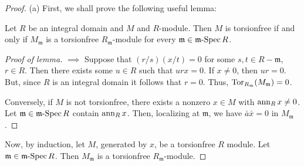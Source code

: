 \begin{proof}
(a) First, we shall prove the following useful lemma:
\begin{lemma*}
Let $R$ be an integral domain and $M$ and $R$-module. Then $M$ is
torsionfree if and only if $M_{\mathfrak{m}}$ is a torsionfree
$R_{\mathfrak{m}}$-module for every $\mathfrak{m}\in\operatorname{\mathfrak{m}-Spec} R$.
\end{lemma*}
\begin{proof}[Proof of lemma]
\renewcommand{\qedsymbol}{$\clubsuit$}
$\implies$ Suppose that $(r/s)(x/t)=0$ for some $s,t\in
R\minus\mathfrak{m}$, $r\in R$. Then there exists some $u\in R$ such that
$urx=0$. If $x\neq 0$, then $ur=0$. But, since $R$ is an integral domain it
follows that $r=0$. Thus, $\operatorname{Tor}_{R_\mathfrak{m}}(M_{\mathfrak{m}})=0$.

Conversely, if $M$ is not torsionfree, there exists a nonzero $x\in M$ with
$\operatorname{ann}_R x\neq 0$. Let $\mathfrak{m}\in\operatorname{\mathfrak{m}-Spec} R$ contain $\operatorname{ann}_R x$. Then,
localizing at $\mathfrak{m}$, we have $\bar a\bar x=0$ in $M_{\mathfrak{m}}$.
\end{proof}
Now, by induction, let $M$, generated by $x$, be a torsionfree $R$
module. Let $\mathfrak{m}\in\operatorname{\mathfrak{m}-Spec} R$. Then $M_{\mathfrak{m}}$ is a
torsionfree $R_{\mathfrak{m}}$-module.
\end{proof}

